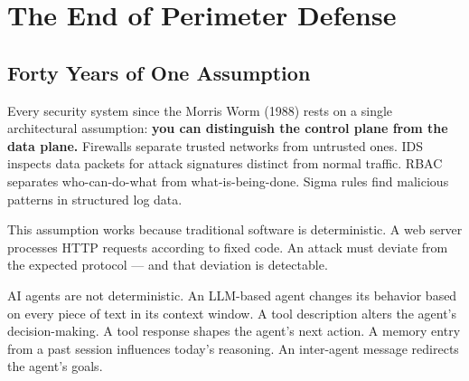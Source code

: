 \documentclass[11pt,letterpaper]{article}
\begin{document}
\begin{abstract}
\textbf{(5)} We present Agent Threat Rules (ATR) \cite{atr}, the first open-source implementation of this standard, and validate it empirically: 108 YAML-based detection rules across 9 threat categories, independently benchmarked at 99.6\% precision and 61.4\% recall against the external PINT dataset \cite{pint} (850 samples), with 100\% precision and 96.9\% recall on the SKILL.md structured content benchmark (498 samples). A mega scan of the agent skill ecosystem \cite{atrscanmega} (53,577 skills across OpenClaw and Skills.sh) found \textbf{946 flagged skills (1.77\%), with 875 rated CRITICAL} --- and the threat crystallization flywheel has been validated in production with 42 community proposals and 926 threat reports. ATR rules have been adopted as upstream detection by Cisco AI Defense \cite{ciscopr79}.
\end{abstract}


\section{The End of Perimeter Defense}
\label{sec:perimeter}

\subsection{Forty Years of One Assumption}

Every security system since the Morris Worm (1988) rests on a single architectural assumption: \textbf{you can distinguish the control plane from the data plane.} Firewalls separate trusted networks from untrusted ones. IDS inspects data packets for attack signatures distinct from normal traffic. RBAC separates who-can-do-what from what-is-being-done. Sigma rules \cite{sigma} find malicious patterns in structured log data.

This assumption works because traditional software is deterministic. A web server processes HTTP requests according to fixed code. An attack must deviate from the expected protocol --- and that deviation is detectable.

AI agents are not deterministic. An LLM-based agent changes its behavior based on every piece of text in its context window. A tool description alters the agent's decision-making. A tool response shapes the agent's next action. A memory entry from a past session influences today's reasoning. An inter-agent message redirects the agent's goals.
\end{document}
